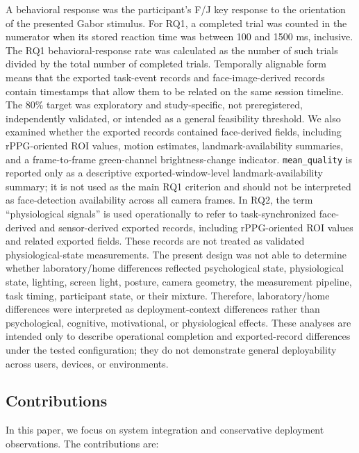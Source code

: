 \documentclass[dvipdfmx]{ehis}
\begin{document}
A behavioral response was the participant's F/J key response to the orientation of the presented Gabor stimulus.
For RQ1, a completed trial was counted in the numerator when its stored reaction time was between 100 and 1500 ms, inclusive.
The RQ1 behavioral-response rate was calculated as the number of such trials divided by the total number of completed trials.
Temporally alignable form means that the exported task-event records and face-image-derived records contain timestamps that allow them to be related on the same session timeline.
The 80\% target was exploratory and study-specific, not preregistered, independently validated, or intended as a general feasibility threshold.
We also examined whether the exported records contained face-derived fields, including rPPG-oriented ROI values, motion estimates, landmark-availability summaries, and a frame-to-frame green-channel brightness-change indicator.
\texttt{mean\_quality} is reported only as a descriptive exported-window-level landmark-availability summary; it is not used as the main RQ1 criterion and should not be interpreted as face-detection availability across all camera frames.
In RQ2, the term ``physiological signals'' is used operationally to refer to task-synchronized face-derived and sensor-derived exported records, including rPPG-oriented ROI values and related exported fields.
These records are not treated as validated physiological-state measurements.
The present design was not able to determine whether laboratory/home differences reflected psychological state, physiological state, lighting, screen light, posture, camera geometry, the measurement pipeline, task timing, participant state, or their mixture.
Therefore, laboratory/home differences were interpreted as deployment-context differences rather than psychological, cognitive, motivational, or physiological effects.
These analyses are intended only to describe operational completion and exported-record differences under the tested configuration; they do not demonstrate general deployability across users, devices, or environments.

\subsection{Contributions}
In this paper, we focus on system integration and conservative deployment observations. The contributions are:
\end{document}

